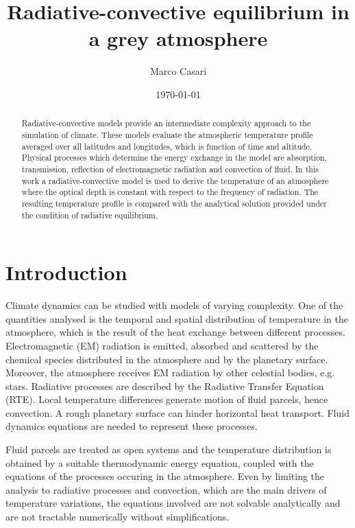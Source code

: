 \documentclass[a4paper,10pt,twocolumn,\classoptions]{article}
\begin{document}
\title{Radiative-convective equilibrium in a grey atmosphere}
\author{Marco Casari}
\date{\today}
\maketitle

\begin{abstract}
  Radiative-convective models provide an intermediate complexity approach to the simulation of climate. These models evaluate the atmospheric temperature profile averaged over all latitudes and longitudes, which is function of time and altitude.
  Physical processes which determine the energy exchange in the model are absorption, transmission, reflection of electromagnetic radiation and convection of fluid.
  In this work a radiative-convective model is used to derive the temperature of an atmosphere where the optical depth is constant with respect to the frequency of radiation. The resulting temperature profile is compared with the analytical solution provided under the condition of radiative equilibrium.
\end{abstract}


\section{Introduction}
Climate dynamics can be studied with models of varying complexity. One of the quantities analysed is the temporal and spatial distribution of temperature in the atmosphere, which is the result of the heat exchange between different processes. Electromagnetic (EM) radiation is emitted, absorbed and scattered by the chemical species distributed in the atmosphere and by the planetary surface. Moreover, the atmosphere receives EM radiation by other celestial bodies, e.g. stars. Radiative processes are described by the Radiative Transfer Equation (RTE).
Local temperature differences generate motion of fluid parcels, hence convection. A rough planetary surface can hinder horizontal heat transport. Fluid dynamics equations are needed to represent these processes.

Fluid parcels are treated as open systems and the temperature distribution is obtained by a suitable thermodynamic energy equation, coupled with the equations of the processes occuring in the atmosphere. Even by limiting the analysis to radiative processes and convection, which are the main drivers of temperature variations, the equations involved are not solvable analytically and are not tractable numerically without simplifications.
\end{document}
